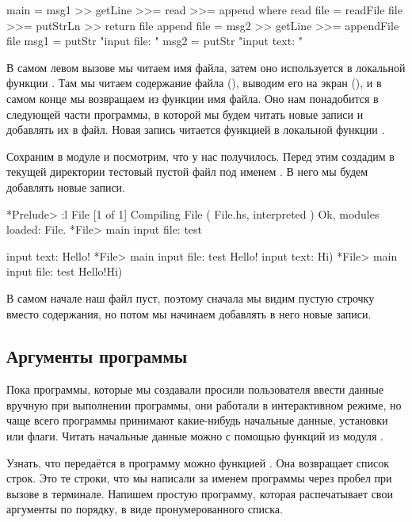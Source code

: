 \begin{code}
main = msg1 >> getLine >>= read >>= append
    where read   file = readFile file >>= putStrLn >> return file
          append file = msg2 >> getLine >>= appendFile file
          msg1        = putStr "input file: "
          msg2        = putStr "input text: "
\end{code}

В самом левом вызове  мы читаем имя файла, затем
оно используется в локальной функции . Там мы читаем
содержание файла (), выводим его на экран (),
и в самом конце мы возвращаем из функции имя файла. Оно нам понадобится
в следующей части программы, в которой мы будем читать новые записи
и добавлять их в файл. Новая запись читается функцией 
в локальной функции .

Сохраним в модуле  и посмотрим, что у нас получилось.
Перед этим создадим в текущей директории тестовый
пустой файл под именем . В него мы будем добавлять новые
записи. 

\begin{code}
*Prelude> :l File
[1 of 1] Compiling File             ( File.hs, interpreted )
Ok, modules loaded: File.
*File> main
input file: test

input text: Hello!
*File> main
input file: test
Hello!
input text: Hi)
*File> main
input file: test
Hello!Hi)
\end{code}

В самом начале наш файл пуст, поэтому сначала мы видим
пустую строчку вместо содержания, но потом мы начинаем добавлять
в него новые записи.

\subsection{Аргументы программы}

Пока программы, которые мы создавали просили пользователя 
ввести данные вручную при выполнении программы,
они работали в интерактивном режиме, но чаще всего программы
принимают какие-нибудь начальные данные, установки или флаги. 
Читать начальные данные можно с помощью функций из модуля 
. 

Узнать, что передаётся в программу можно функцией 
. Она возвращает список строк. Это те строки, что
мы написали за именем программы через пробел при вызове в терминале.
Напишем простую программу, которая распечатывает свои аргументы
по порядку, в виде пронумерованного списка.

